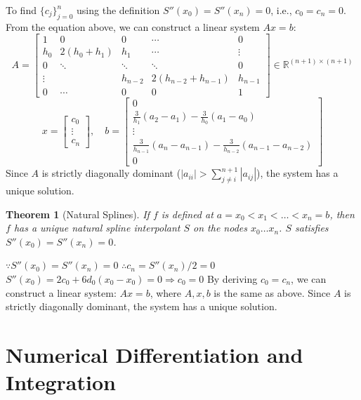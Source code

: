 \documentclass[12pt, a4paper]{article}
\makeatletter
\theoremstyle{break}
\newtheorem{theorem}{Theorem}[section]
\renewenvironment{proof}[1][\proofname]{\par
  \pushQED{\qed}%
  \normalfont \topsep6\p@\@plus6\p@\relax
  \trivlist
  \item[\hskip\labelsep\bfseries #1\@addpunct{.}]\mbox{}\newline\ignorespaces
}{%
  \popQED\endtrivlist\@endpefalse
}
\makeatother
\begin{document}
To find $\{c_j\}_{j=0}^{n}$ using the definition $S''(x_0) = S''(x_n) = 0$, i.e., $c_0 = c_n = 0$. From the equation above, we can construct a linear system $Ax = b$:
\[
A = \begin{bmatrix}
1 & 0 & 0 & \cdots & 0 \\
h_0 & 2(h_0+h_1) & h_1 & \cdots & \vdots \\
0 & \ddots & \ddots & \ddots & 0 \\
\vdots & & h_{n-2} & 2(h_{n-2}+h_{n-1}) & h_{n-1} \\
0 & \cdots & 0 & 0 & 1
\end{bmatrix} \in \mathbb{R}^{(n+1) \times (n+1)}
\]
\[
x = \begin{bmatrix} c_0 \\ \vdots \\ c_n \end{bmatrix}, \quad
b = \begin{bmatrix} 0 \\ \frac{3}{h_1}(a_2-a_1) - \frac{3}{h_0}(a_1-a_0) \\ \vdots \\ \frac{3}{h_{n-1}}(a_n-a_{n-1}) - \frac{3}{h_{n-2}}(a_{n-1}-a_{n-2}) \\ 0 \end{bmatrix}
\]
Since $A$ is strictly diagonally dominant ($|a_{ii}| > \sum_{j \neq i}^{n+1} |a_{ij}|$), the system has a unique solution.

\begin{theorem}[Natural Splines]
If $f$ is defined at $a = x_0 < x_1 < \dots < x_n = b$, then $f$ has a unique natural spline interpolant $S$ on the nodes $x_0 \dots x_n$. $S$ satisfies $S''(x_0) = S''(x_n) = 0$.
\end{theorem}
\begin{proof}
$\because S''(x_0) = S''(x_n) = 0$
$\therefore c_n = S''(x_n)/2 = 0$
$S''(x_0) = 2c_0 + 6d_0(x_0 - x_0) = 0 \Rightarrow c_0 = 0$
By deriving $c_0 = c_n$, we can construct a linear system: $Ax = b$, where $A, x, b$ is the same as above. Since $A$ is strictly diagonally dominant, the system has a unique solution.
\end{proof}

\section{Numerical Differentiation and Integration}
\end{document}
